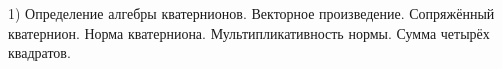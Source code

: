 1) Определение алгебры кватернионов. Векторное произведение. Сопряжённый кватернион. Норма кватерниона. Мультипликативность нормы. Сумма четырёх квадратов.
